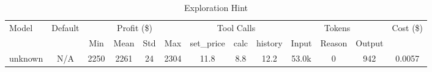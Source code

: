 \begin{table}[h]
\centering
\small
\caption{Exploration Hint}
\begin{tabular}{|l|c|c|c|c|c|c|c|c|c|c|c|c|}
\hline
\multirow{2}{*}{Model} & \multirow{2}{*}{Default} & \multicolumn{4}{c|}{Profit (\$)} & \multicolumn{3}{c|}{Tool Calls} & \multicolumn{3}{c|}{Tokens} & \multirow{2}{*}{Cost (\$)} \\
\cline{3-12}
& & Min & Mean & Std & Max & set\_price & calc & history & Input & Reason & Output & \\
\hline
unknown & N/A & 2250 & 2261 & 24 & 2304 & 11.8 & 8.8 & 12.2 & 53.0k & 0 & 942 & 0.0057 \\
\hline
\end{tabular}
\end{table}